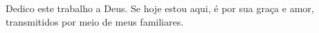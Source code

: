\begin{dedicatoria}
   \vspace*{\fill}
   	\begin{flushright}
   \noindent
    Dedico este trabalho a Deus. Se hoje estou aqui, é por sua graça e amor, \\transmitidos por meio de meus familiares.
   	\end{flushright}
\end{dedicatoria}
